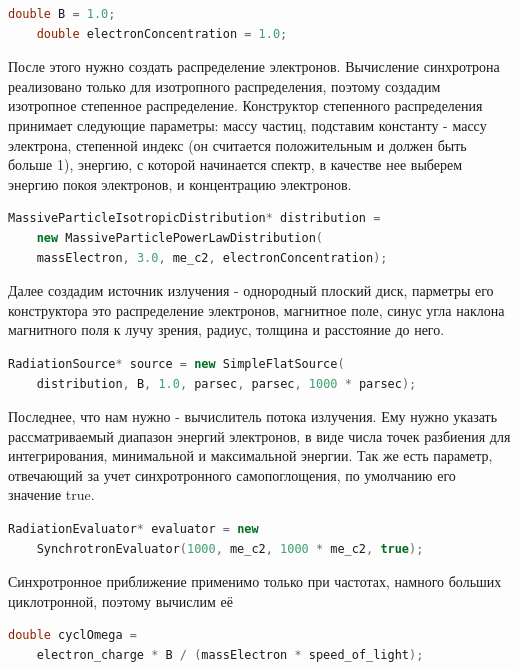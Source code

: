 \begin{lstlisting}[language=c++]
	double B = 1.0;
	double electronConcentration = 1.0;
\end{lstlisting}

После этого нужно создать распределение электронов. Вычисление синхротрона реализовано только для изотропного распределения, поэтому создадим изотропное степенное распределение. Конструктор степенного распределения принимает следующие параметры: массу частиц, подставим константу - массу электрона, степенной индекс (он считается положительным и должен быть больше 1), энергию, с которой начинается спектр, в качестве нее выберем энергию покоя электронов, и концентрацию электронов.

\begin{lstlisting}[language=c++]
	MassiveParticleIsotropicDistribution* distribution =
	new MassiveParticlePowerLawDistribution(
	massElectron, 3.0, me_c2, electronConcentration);
\end{lstlisting}

Далее создадим источник излучения - однородный плоский диск, парметры его конструктора это распределение электронов, магнитное поле, синус угла наклона магнитного поля к лучу зрения, радиус, толщина и расстояние до него.

\begin{lstlisting}[language=c++]
	RadiationSource* source = new SimpleFlatSource(
	distribution, B, 1.0, parsec, parsec, 1000 * parsec);
\end{lstlisting}

Последнее, что нам нужно - вычислитель потока излучения. Ему нужно указать рассматриваемый диапазон энергий электронов, в виде числа точек разбиения для интегрирования, минимальной и максимальной энергии. Так же есть параметр, отвечающий за учет синхротронного самопоглощения, по умолчанию его значение true.

\begin{lstlisting}[language=c++]
	RadiationEvaluator* evaluator = new 
	SynchrotronEvaluator(1000, me_c2, 1000 * me_c2, true);
\end{lstlisting}

Синхротронное приближение применимо только при частотах, намного больших циклотронной, поэтому вычислим её

\begin{lstlisting}[language=c++]
	double cyclOmega = 
	electron_charge * B / (massElectron * speed_of_light);
\end{lstlisting}

